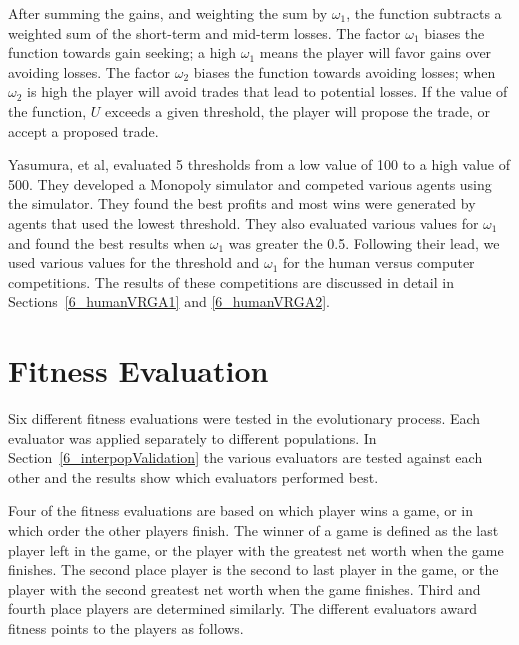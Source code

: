 After summing the gains, and weighting the sum by \(\omega_1\), the function
subtracts a weighted sum of the short-term and mid-term losses. The factor
\(\omega_1\) biases the function towards gain seeking; a high \(\omega_1\) means
the player will favor gains over avoiding losses. The factor \(\omega_2\) biases
the function towards avoiding losses; when \(\omega_2\) is high the player will
avoid trades that lead to potential losses. If the value of the function, \(U\)
exceeds a given threshold, the player will propose the trade, or accept a
proposed trade. 

Yasumura, et al, evaluated 5 thresholds from a low value of 100 to a high value
of 500. They developed a Monopoly simulator and competed various agents using
the simulator. They found the best profits and most wins were generated by
agents that used the lowest threshold. They also evaluated various values for
\(\omega_1\) and found the best results when \(\omega_1\) was greater the 0.5.
Following their lead, we used various values for the threshold and \(\omega_1\)
for the human versus computer competitions. The results of these competitions
are discussed in detail in Sections~\ref{6_humanVRGA1} and \ref{6_humanVRGA2}.

\section{Fitness Evaluation} \label{5_fitnesseval}

Six different fitness evaluations were tested in the evolutionary process. Each
evaluator was applied separately to different populations. In 
Section~\ref{6_interpopValidation} the various evaluators are tested against 
each other and the results show which evaluators performed best.

Four of the fitness evaluations are based on which player wins a game, or in
which order the other players finish. The winner of a game is defined as the
last player left in the game, or the player with the greatest net worth when the
game finishes. The second place player is the second to last player in the game,
or the player with the second greatest net worth when the game finishes. Third
and fourth place players are determined similarly. The different evaluators
award fitness points to the players as follows.


